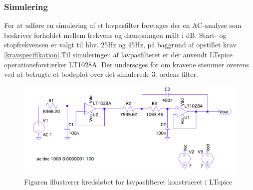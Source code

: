 \subsubsection{Simulering}
For at udføre en simulering af et lavpasfilter foretages der en AC-analyse som beskriver forholdet mellem frekvens og dæmpningen målt i dB. Start- og stopfrekvensen er valgt til hhv. 25Hz og 45Hz, på baggrund af opstillet krav \ref{kravspecifikation}.Til simuleringen af lavpasfilteret er der anvendt LTspice operationsforstærker LT1028A. Der undersøges for om kravene stemmer overens ved at betragte et bodeplot over det simulerede 3. ordens filter.

\begin{figure}[H]
	\centering
	\includegraphics[scale=0.4]{figures/cProblemloesning/Lavpasfilter_LTspice.PNG}
	\caption{Figuren illustrerer kredsløbet for lavpasfilteret konstrueret i LTspice}
	\label{fig:lavpasfilter_LTspice}
\end{figure}


